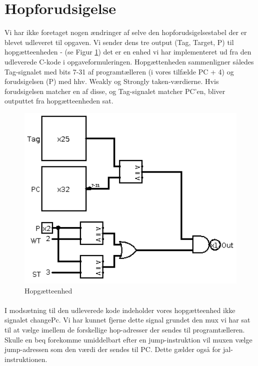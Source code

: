 \documentclass[10pt,a4paper,danish]{article}
\begin{document}
\section{Hopforudsigelse}
Vi har ikke foretaget nogen ændringer af selve den hopforudsigelsestabel der er 
blevet udleveret til opgaven. Vi sender dens tre output (Tag, Target, P) til 
hopgætteenheden - (se Figur \ref{fig:bgu}) det er en enhed vi har implementeret ud
 fra den udleverede C-kode i opgaveformuleringen. Hopgættenheden sammenligner 
således Tag-signalet med bits 7-31 af programtælleren (i vores tilfælde PC + 4)
 og forudsigelsen (P) med hhv. Weakly og Strongly taken-værdierne. Hvis 
forudsigelsen matcher en af disse, og Tag-signalet matcher PC'en, bliver 
outputtet fra hopgætteenheden sat.

\begin{figure}[htb]
\begin{center}
\leavevmode
\includegraphics[width=1\textwidth]{branch_guessing_unit.png}
\end{center}
\caption{Hopgætteenhed}
\label{fig:bgu} 
\end{figure} 

\paragraph{}
I modsætning til den udleverede kode indeholder vores hopgætteenhed ikke 
signalet changePc. Vi har kunnet fjerne dette signal grundet den mux vi har 
sat til at vælge imellem de forskellige hop-adresser der sendes til 
programtælleren. Skulle en beq forekomme umiddelbart efter en jump-instruktion
vil muxen vælge jump-adressen som den værdi der sendes til PC. Dette gælder
også for jal-instruktionen. 
\end{document}
